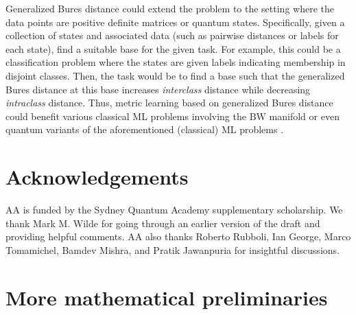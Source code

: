 \documentclass[12pt]{article}
\theoremstyle{definition}
\begin{document}
Generalized Bures distance could extend the problem to the setting where the data points are positive definite matrices or quantum states. Specifically, given a collection of states and associated data (such as pairwise distances or labels for each state), find a suitable base for the given task. For example, this could be a classification problem where the states are given labels indicating membership in disjoint classes. Then, the task would be to find a base such that the generalized Bures distance at this base increases \textit{interclass} distance while decreasing \textit{intraclass} distance. Thus, metric learning based on generalized Bures distance could benefit various classical ML problems involving the BW manifold or even quantum variants of the aforementioned (classical) ML problems \cite{wiebe2015quantum, basheer2020quantum, schuld2014quantum, duan2019quantum, liang2020variational}.



\section{Acknowledgements }
AA is funded by the Sydney Quantum Academy supplementary scholarship. We thank Mark M. Wilde for going through an earlier version of the draft and providing helpful comments. AA also thanks Roberto Rubboli, Ian George, Marco Tomamichel, Bamdev Mishra, and Pratik Jawanpuria for insightful discussions. 






\appendix
\newpage

\section{More mathematical preliminaries} \label{App:MoreMathPrelim}
\end{document}
